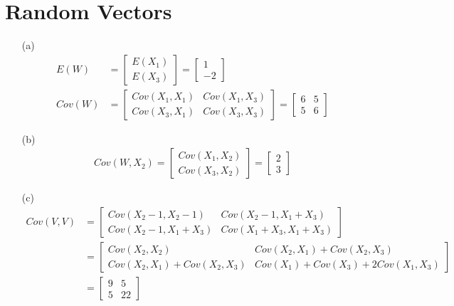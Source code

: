 \documentclass{article}
\begin{document}
\section{Random Vectors}
\begin{itemize}
    \item [(a)]
    \begin{align*}
        E(W)&=
        \begin{bmatrix}
            E(X_1)\\E(X_3)
        \end{bmatrix}
        =
        \begin{bmatrix}
            1\\-2
        \end{bmatrix}
        \\Cov(W)&=
        \begin{bmatrix}
            Cov(X_1,X_1)&Cov(X_1,X_3)\\
            Cov(X_3,X_1)&Cov(X_3,X_3)
        \end{bmatrix}
        =
        \begin{bmatrix}
            6&5\\5&6
        \end{bmatrix}
    \end{align*}
    \item [(b)]
    \begin{align*}
        Cov(W,X_2)=
        \begin{bmatrix}
            Cov(X_1,X_2)\\Cov(X_3,X_2)
        \end{bmatrix}
        =
        \begin{bmatrix}
            2\\3
        \end{bmatrix}
    \end{align*}
    \item [(c)]
    \begin{align*}
        Cov(V,V)&=
        \begin{bmatrix}
            Cov(X_2-1,X_2-1)&Cov(X_2-1,X_1+X_3)\\
            Cov(X_2-1,X_1+X_3)&Cov(X_1+X_3,X_1+X_3)
        \end{bmatrix}\\
        &=
        \begin{bmatrix}
            Cov(X_2,X_2)&Cov(X_2,X_1)+Cov(X_2,X_3)\\
            Cov(X_2,X_1)+Cov(X_2,X_3)&Cov(X_1)+Cov(X_3)+2Cov(X_1,X_3)
        \end{bmatrix}\\
        &=
        \begin{bmatrix}
            9&5\\5&22
        \end{bmatrix}
    \end{align*}
\end{itemize}
\end{document}

